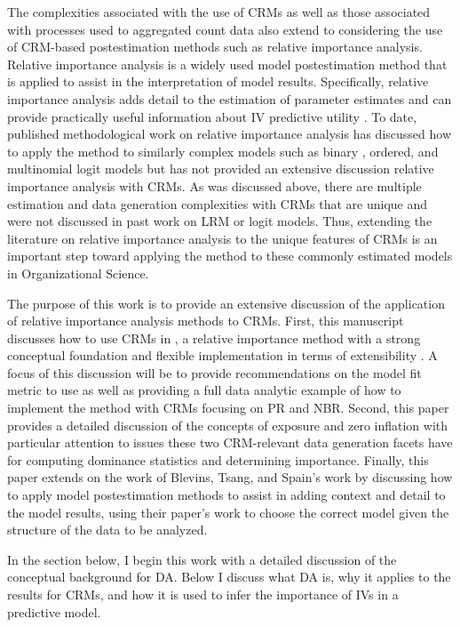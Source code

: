 \documentclass[ShortAfour,times,sageapa]{sagej}
\begin{document}
	The complexities associated with the use of CRMs as well as those associated with processes used to aggregated count data also extend to considering the use of CRM-based postestimation methods such as relative importance analysis. 
	Relative importance analysis is a widely used model postestimation method that is applied to assist in the interpretation of model results.  
	Specifically, relative importance analysis adds detail to the estimation of parameter estimates and can provide practically useful information about IV predictive utility \cite{tonidandel2011relative}.  
	To date, published methodological work on relative importance analysis has discussed how to apply the method to similarly complex models such as binary \cite{azen2009using}, ordered, and multinomial logit models \cite{luchman2014relative} but has not provided an extensive discussion relative importance analysis with CRMs.
	As was discussed above, there are multiple estimation and data generation complexities with CRMs that are unique and were not discussed in past work on LRM or logit models.
	Thus, extending the literature on relative importance analysis to the unique features of CRMs is an important step toward applying the method to these commonly estimated models in Organizational Science.
	
	The purpose of this work is to provide an extensive discussion of the application of relative importance analysis methods to CRMs.
	First, this manuscript discusses how to use CRMs in \cite[dominance analysis/DA]{azen2003dominance}, a relative importance method with a strong conceptual foundation \cite{gromping2007estimators} and flexible implementation in terms of extensibility \cite[see]{luchman2021determining}.
	A focus of this discussion will be to provide recommendations on the model fit metric to use as well as providing a full data analytic example of how to implement the method with CRMs focusing on PR and NBR.
	Second, this paper provides a detailed discussion of the concepts of exposure and zero inflation with particular attention to issues these two CRM-relevant data generation facets have for computing dominance statistics and determining importance.
	Finally, this paper extends on the work of Blevins, Tsang, and Spain's \cite{blevins2015count} work by discussing how to apply model postestimation methods to assist in adding context and detail to the model results, using their paper's work to choose the correct model given the structure of the data to be analyzed.
	
	In the section below, I begin this work with a detailed discussion of the conceptual background for DA.
	Below I discuss what DA is, why it applies to the results for CRMs, and how it is used to infer the importance of IVs in a predictive model.
		
\end{document}
